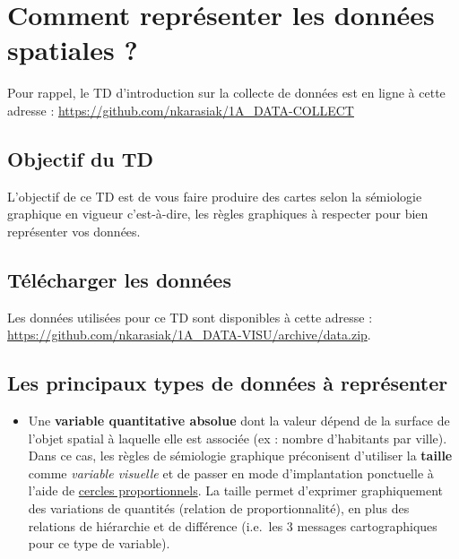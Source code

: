\section{Comment représenter les données spatiales
?}\label{comment-repruxe9senter-les-donnuxe9es-spatiales}

Pour rappel, le TD d'introduction sur la collecte de données est en
ligne à cette adresse :
\url{https://github.com/nkarasiak/1A_DATA-COLLECT}

\subsection{Objectif du TD}\label{objectif-du-td}

L'objectif de ce TD est de vous faire produire des cartes selon la
sémiologie graphique en vigueur c'est-à-dire, les règles graphiques à
respecter pour bien représenter vos données.

\subsection{Télécharger les
données}\label{tuxe9luxe9charger-les-donnuxe9es}

Les données utilisées pour ce TD sont disponibles à cette adresse :
\url{https://github.com/nkarasiak/1A_DATA-VISU/archive/data.zip}.

\subsection{Les principaux types de données à
représenter}\label{les-principaux-types-de-donnuxe9es-uxe0-repruxe9senter}

\begin{itemize}
\tightlist
\item
  Une \textbf{variable quantitative absolue} dont la valeur dépend de la
  surface de l'objet spatial à laquelle elle est associée (ex : nombre
  d'habitants par ville). Dans ce cas, les règles de sémiologie
  graphique préconisent d'utiliser la \textbf{taille} comme
  \emph{variable visuelle} et de passer en mode d'implantation
  ponctuelle à l'aide de
  \href{https://www.geoclip.fr/portfolio-item/carte-a-symboles-proportionnels/}{cercles
  proportionnels}. La taille permet d'exprimer graphiquement des
  variations de quantités (relation de proportionnalité), en plus des
  relations de hiérarchie et de différence (i.e.~les 3 messages
  cartographiques pour ce type de variable).
\end{itemize}

